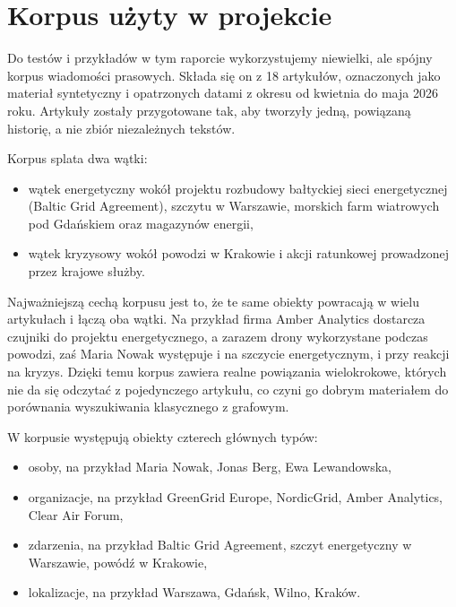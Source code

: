\documentclass[11pt,a4paper]{article}
\begin{document}
\appendix
\section{Korpus użyty w projekcie}
\label{app:korpus}

Do testów i przykładów w tym raporcie wykorzystujemy niewielki, ale spójny korpus wiadomości
prasowych. Składa się on z 18 artykułów, oznaczonych jako materiał syntetyczny i opatrzonych
datami z okresu od kwietnia do maja 2026 roku. Artykuły zostały przygotowane tak, aby tworzyły
jedną, powiązaną historię, a nie zbiór niezależnych tekstów.

Korpus splata dwa wątki:
\begin{itemize}[itemsep=2pt]
  \item wątek energetyczny wokół projektu rozbudowy bałtyckiej sieci energetycznej (Baltic
        Grid Agreement), szczytu w Warszawie, morskich farm wiatrowych pod Gdańskiem oraz
        magazynów energii,
  \item wątek kryzysowy wokół powodzi w Krakowie i akcji ratunkowej prowadzonej przez
        krajowe służby.
\end{itemize}

Najważniejszą cechą korpusu jest to, że te same obiekty powracają w wielu artykułach i łączą
oba wątki. Na przykład firma Amber Analytics dostarcza czujniki do projektu energetycznego, a
zarazem drony wykorzystane podczas powodzi, zaś Maria Nowak występuje i na szczycie
energetycznym, i przy reakcji na kryzys. Dzięki temu korpus zawiera realne powiązania
wielokrokowe, których nie da się odczytać z pojedynczego artykułu, co czyni go dobrym
materiałem do porównania wyszukiwania klasycznego z grafowym.

W korpusie występują obiekty czterech głównych typów:
\begin{itemize}[itemsep=2pt]
  \item osoby, na przykład Maria Nowak, Jonas Berg, Ewa Lewandowska,
  \item organizacje, na przykład GreenGrid Europe, NordicGrid, Amber Analytics, Clear Air
        Forum,
  \item zdarzenia, na przykład Baltic Grid Agreement, szczyt energetyczny w Warszawie, powódź
        w Krakowie,
  \item lokalizacje, na przykład Warszawa, Gdańsk, Wilno, Kraków.
\end{itemize}
\end{document}
